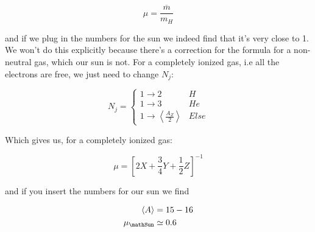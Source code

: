 \begin{equation}
	\mu = \frac{\overline{m}}{m_H}
\end{equation}

and if we plug in the numbers for the sun we indeed find that it's very close to 1. We won't do this explicitly because there's a correction for the formula for a non-neutral gas, which our sun is not. For a completely ionized gas, i.e all the electrons are free, we just need to change \(N_j\):

\begin{equation}
	N_j = \begin{cases}
		1\rightarrow2 & H\\
		1\rightarrow3 & He\\
		1\rightarrow\left\langle\frac{A_Z}{2}\right\rangle & Else
	\end{cases}
\end{equation}

Which gives us, for a completely ionized gas:

\begin{equation}
	\mu = {\left[2X+\frac{3}{4}Y+\frac{1}{2}Z\right]}^{-1}
\end{equation}

and if you insert the numbers for our sun we find

\begin{align}
	\left\langle A\right\rangle &= 15-16\\
	\mu_\mathSun &\simeq 0.6
\end{align}
